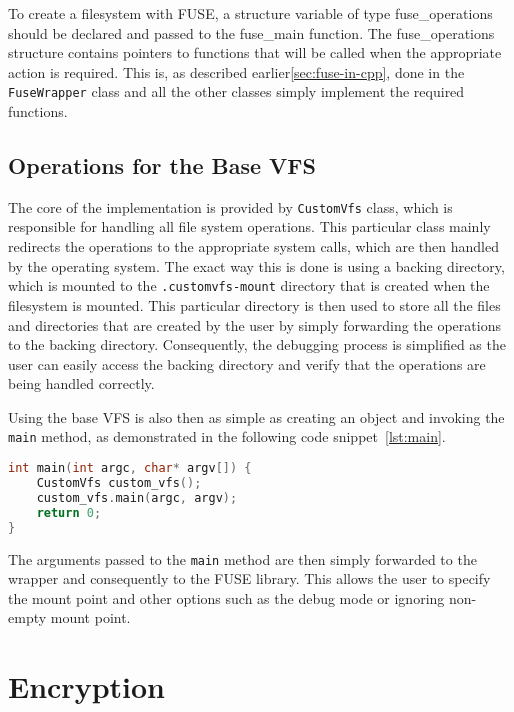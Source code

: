 To create a filesystem with FUSE, a structure variable of type fuse\_operations should be declared and passed to the fuse\_main function.
The fuse\_operations structure contains pointers to functions that will be called when the appropriate action is required.
This is, as described earlier\ref{sec:fuse-in-cpp}, done in the \texttt{FuseWrapper} class and all the other classes simply implement the required functions.

\subsection{Operations for the Base VFS}\label{subsec:base-ops}

The core of the implementation is provided by \texttt{CustomVfs} class, which is responsible for handling all file system operations.
This particular class mainly redirects the operations to the appropriate system calls, which are then handled by the operating system.
The exact way this is done is using a backing directory, which is mounted to the \texttt{.customvfs-{mount}} directory that is created when the filesystem is mounted.
This particular directory is then used to store all the files and directories that are created by the user by simply forwarding the operations to the backing directory.
Consequently, the debugging process is simplified as the user can easily access the backing directory and verify that the operations are being handled correctly.

Using the base VFS is also then as simple as creating an object and invoking the \texttt{main} method, as demonstrated in the following code snippet~\ref{lst:main}.

\begin{lstlisting}[language=c++, basicstyle=\ttfamily\small, caption={Main method of the \texttt{CustomVfs} class}, label={lst:main}]
int main(int argc, char* argv[]) {
    CustomVfs custom_vfs();
    custom_vfs.main(argc, argv);
    return 0;
}
\end{lstlisting}

The arguments passed to the \texttt{main} method are then simply forwarded to the wrapper and consequently to the FUSE library.
This allows the user to specify the mount point and other options such as the debug mode or ignoring non-empty mount point.


\section{Encryption}\label{sec:encryption}

